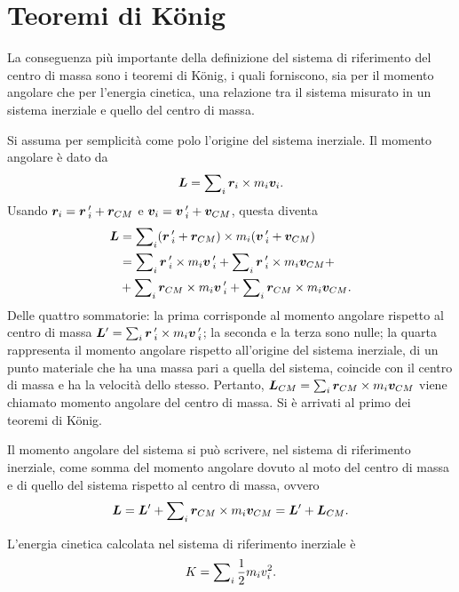 \section{Teoremi di K\"onig}
La conseguenza più importante della definizione del sistema di riferimento del centro di massa sono i teoremi di K\"onig, i quali forniscono, sia per il momento angolare che per l'energia cinetica, una relazione tra il sistema misurato in un sistema inerziale e quello del centro di massa. 

Si assuma per semplicità come polo l'origine del sistema inerziale. Il momento angolare è dato da
\begin{equation}
    \bm{L}=\sum\nolimits_i\bm{r}_i\times m_i\bm{v}_i.
\end{equation}
Usando $\bm{r}_i=\bm{r}\,'_i+\bm{r}_{CM}$ e $\bm{v}_i=\bm{v}\,'_i+\bm{v}_{CM}$, questa diventa
\begin{equation}
    \begin{split}
        \bm{L}&=\sum\nolimits_i(\bm{r}\,'_i+\bm{r}_{CM})\times m_i(\bm{v}\,'_i+\bm{v}_{CM}) \\
        &=\sum\nolimits_i\bm{r}\,'_i\times m_i\bm{v}\,'_i+\sum\nolimits_i\bm{r}\,'_i\times m_i\bm{v}_{CM}+ \\
        &+\sum\nolimits_i\bm{r}_{CM}\times m_i\bm{v}\,'_i+\sum\nolimits_i\bm{r}_{CM}\times m_i\bm{v}_{CM}.
    \end{split}
\end{equation}
Delle quattro sommatorie: la prima corrisponde al momento angolare rispetto al centro di massa $\bm{L}'=\sum\nolimits_i\bm{r}\,'_i\times m_i\bm{v}\,'_i$; la seconda e la terza sono nulle; la quarta rappresenta il momento angolare rispetto all'origine del sistema inerziale, di un punto materiale che ha una massa pari a quella del sistema, coincide con il centro di massa e ha la velocità dello stesso. Pertanto, $\bm{L}_{CM}=\sum\nolimits_i\bm{r}_{CM}\times m_i\bm{v}_{CM}$ viene chiamato momento angolare del centro di massa. Si è arrivati al primo dei teoremi di K\"onig. 
\begin{teo}
    Il momento angolare del sistema si può scrivere, nel sistema di riferimento inerziale, come somma del momento angolare dovuto al moto del centro di massa e di quello del sistema rispetto al centro di massa, ovvero
    \begin{equation}
    \label{eq: primo teo. konig}
        \bm{L}=\bm{L}'+\sum\nolimits_i\bm{r}_{CM}\times m_i\bm{v}_{CM}=\bm{L}'+\bm{L}_{CM}.
    \end{equation}
\end{teo}
L'energia cinetica calcolata nel sistema di riferimento inerziale è
\begin{equation}
    K=\sum\nolimits_i\frac{1}{2}m_iv_i^2.
\end{equation}
